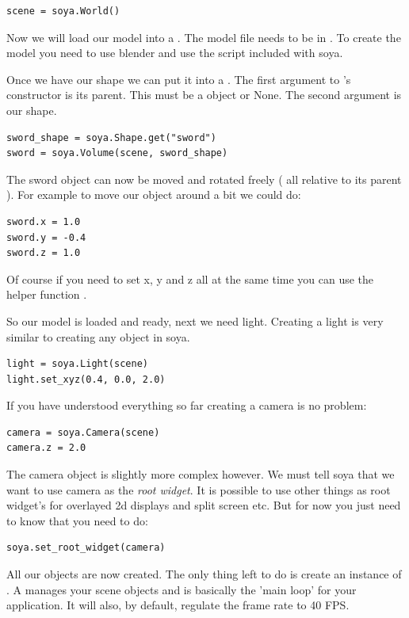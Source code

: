 \begin{verbatim}
scene = soya.World()
\end{verbatim}

Now we will load our model into a . The model file needs to
be in . To create the model you need to use 
blender and use the  script included with soya. 

Once we have our shape we can put it into a . 
The first argument to 's constructor is its parent. This 
must be a  object or None. The second argument is our shape.

\begin{verbatim}
sword_shape = soya.Shape.get("sword")
sword = soya.Volume(scene, sword_shape)
\end{verbatim}

The sword object can now be moved and rotated freely ( all relative to its
parent ). For example to move our object around a bit we could do:

\begin{verbatim}
sword.x = 1.0
sword.y = -0.4
sword.z = 1.0
\end{verbatim}

Of course if you need to set x, y and z all at the same time you can use 
the helper function .

So our model is loaded and ready, next we need light. Creating a light 
is very similar to creating any object in soya. 

\begin{verbatim}
light = soya.Light(scene)
light.set_xyz(0.4, 0.0, 2.0)
\end{verbatim}

If you have understood everything so far creating a camera is no problem:
\begin{verbatim}
camera = soya.Camera(scene)
camera.z = 2.0
\end{verbatim}

The camera object is slightly more complex however. We must tell soya that 
we want to use camera as the \emph{root widget}. It is possible to use 
other things as root widget's for overlayed 2d displays and split screen etc. 
But for now you just need to know that you need to do:
\begin{verbatim}
soya.set_root_widget(camera)
\end{verbatim}

All our objects are now created. The only thing left to do is create an 
instance of . A  manages your scene objects
and is basically the 'main loop' for your application. It will also, by default, 
regulate the frame rate to 40 FPS. 

